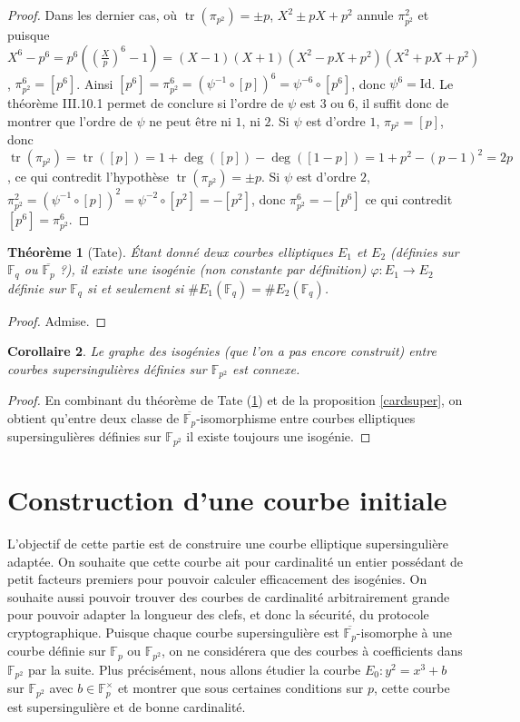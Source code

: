 \documentclass{article}
\theoremstyle{plain}%
\newtheorem{thm}{Théorème}[section]
\newtheorem{cor}[thm]{Corollaire}
\theoremstyle{definition}%
\newcommand{\F}{\mathbb{F}}
\DeclareMathOperator{\tr}{tr}
\begin{document}
\begin{proof}
\vspace{1em}
Dans les dernier cas, où $\tr(\pi_{p^2}) = \pm p$, $X^2 \pm p X +p^2$ annule $\pi_{p^2}^2$ et puisque $X^6 - p^6 = p^6 ((\frac{X}{p})^6 - 1) = (X-1)(X+1)(X^2 -pX + p^2)(X^2 + pX + p^2)$, $\pi_{p^2}^6 = [p^6]$. Ainsi $[p^6] = \pi_{p^2}^6  = (\psi^{-1} \circ [p])^6 = \psi^{-6} \circ [p^6]$, donc $\psi^6 = \text{Id}$. Le théorème III.10.1 permet de conclure si l'ordre de $\psi$ est $3$ ou $6$, il suffit donc de montrer que l'ordre de $\psi$ ne peut être ni $1$, ni $2$.
Si $\psi$ est d'ordre $1$, $\pi_{p^2} = [p]$, donc $\tr(\pi_{p^2}) = \tr([p]) = 1 + \deg([p]) - \deg([1-p]) = 1 + p^2 -(p-1)^2 = 2p$, ce qui contredit l'hypothèse $\tr(\pi_{p^2}) = \pm p$. 
Si $\psi$ est d'ordre $2$, $\pi_{p^2}^2 = (\psi^{-1} \circ [p])^2 = \psi^{-2} \circ [p^2] = - [p^2]$, donc $\pi_{p^2}^6 = -[p^6]$ ce qui contredit $[p^6] = \pi_{p^2}^6$. 
\end{proof}

\begin{thm}[Tate]
  \label{tate}
  Étant donné deux courbes elliptiques $E_1$ et $E_2$ (définies sur $\F_{q}$ ou $\overline{\F_p}$ ?), il existe une isogénie (non constante par définition) $\varphi : E_1 \to E_2$ définie sur $\F_q$ si et seulement si $\# E_1(\F_q) = \# E_2(\F_q)$. \end{thm}

\begin{proof}
  Admise.
\end{proof}

\begin{cor}
  Le graphe des isogénies (que l'on a pas encore construit) entre courbes supersingulières définies sur $\F_{p^2}$ est connexe.
\end{cor}

\begin{proof}
  En combinant du théorème de Tate (\ref{tate}) et de la proposition \ref{cardsuper}, on obtient qu'entre deux classe de $\overline{\F_p}$-isomorphisme entre courbes elliptiques supersingulières définies sur $\F_{p^2}$ il existe toujours une isogénie.
\end{proof}

\section{Construction d'une courbe initiale}

L'objectif de cette partie est de construire une courbe elliptique supersingulière adaptée. 
On souhaite que cette courbe ait pour cardinalité un entier possédant de petit facteurs premiers pour pouvoir calculer efficacement des isogénies. 
On souhaite aussi pouvoir trouver des courbes de cardinalité arbitrairement grande pour pouvoir adapter la longueur des clefs, et donc la sécurité, du protocole cryptographique.
Puisque chaque courbe supersingulière est $\overline{\F_p}$-isomorphe à une courbe définie sur $\F_{p}$ ou $\F_{p^2}$, on ne considérera que des courbes à coefficients dans $\F_{p^2}$ par la suite.
Plus précisément, nous allons étudier la courbe $E_0 : y^2 = x^3 + b$ sur $\F_{p^2}$ avec $b\in\F_{p}^\times$ et montrer que sous certaines conditions sur $p$, cette courbe est supersingulière et de bonne cardinalité.
\end{document}
